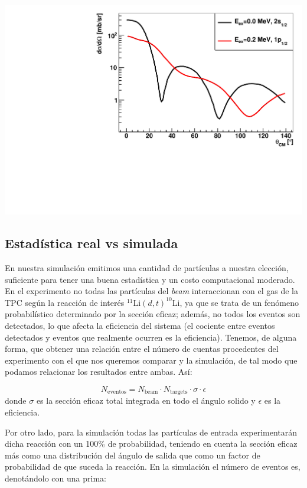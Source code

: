 \begin{center}
	\includegraphics[width=0.7\linewidth]{Imagenes/Seccion_Eficaz.pdf}
	\label{Fig:04-seccion_eficaz}
\end{center}


\subsection{Estadística real vs simulada}

En nuestra simulación emitimos una cantidad de partículas a nuestra elección, suficiente para tener una buena estadística y un costo computacional moderado. En el experimento no todas las partículas del \textit{beam} interaccionan con el gas de la TPC según la reacción de interés $^{11} \text{Li}(d,t)^{10}\text{Li}$, ya que se trata de un fenómeno probabilístico determinado por la sección eficaz; además, no todos los eventos son detectados, lo que afecta la eficiencia del sistema (el cociente entre eventos detectados y eventos que realmente ocurren es la eficiencia). Tenemos, de alguna forma, que obtener una relación entre el número de cuentas procedentes del experimento con el que nos queremos comparar y la simulación, de tal modo que podamos relacionar los resultados entre ambas. Así:

\begin{equation}
	N_{\text{eventos}}  = N_{\text{beam}} \cdot N_{\text{targets}} \cdot \sigma \cdot \epsilon \label{Ec:3.21}
\end{equation}
donde $\sigma$ es la sección eficaz total integrada en todo el ángulo solido y $\epsilon$ es la eficiencia. 

Por otro lado, para la simulación todas las partículas de entrada experimentarán dicha reacción con un 100\% de probabilidad, teniendo en cuenta la sección eficaz más como una distribución del ángulo de salida que como un factor de probabilidad de  que suceda la reacción. En la simulación el número de eventos es, denotándolo con una prima:


